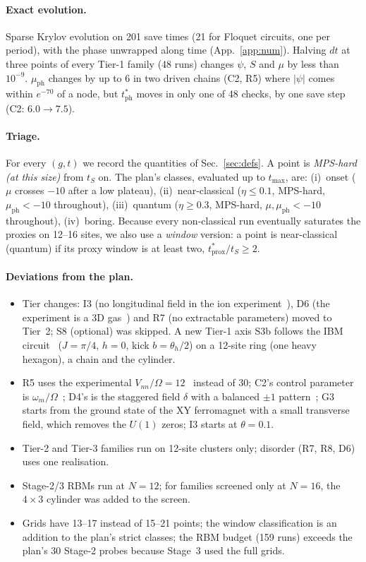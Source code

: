 \documentclass[11pt,a4paper]{article}
\newcommand{\tph}{t^*_{\mathrm{ph}}}
\newcommand{\tprox}{t^*_{\mathrm{prox}}}
\begin{document}
\paragraph{Exact evolution.} Sparse Krylov evolution on 201 save times (21 for Floquet circuits, one per period),
with the phase unwrapped along time (App.~\ref{app:num}). Halving $dt$ at three points of every Tier-1 family (48 runs)
changes $\psi$, $S$ and $\mu$ by less than $10^{-9}$. $\mu_{\mathrm{ph}}$ changes by up to $6$ in two driven chains
(C2, R5) where $|\psi|$ comes within $e^{-70}$ of a node, but $\tph$ moves in only one of 48 checks, by one save step
(C2: $6.0\to7.5$).

\paragraph{Triage.} For every $(g,t)$ we record the quantities of Sec.~\ref{sec:defs}. A point is
\emph{MPS-hard (at this size)} from $t_S$ on. The plan's classes,
evaluated up to $t_{\max}$, are: (i)~onset ($\mu$ crosses $-10$ after a low plateau), (ii)~near-classical
($\eta\le0.1$, MPS-hard, $\mu_{\mathrm{ph}}<-10$ throughout), (iii)~quantum ($\eta\ge0.3$,
MPS-hard, $\mu,\mu_{\mathrm{ph}}<-10$ throughout), (iv)~boring. Because every non-classical run
eventually saturates the proxies on 12--16 sites, we also use a \emph{window} version: a point is near-classical
(quantum) if its proxy window is at least two, $\tprox/t_S\ge2$.

\paragraph{Deviations from the plan.}
\begin{itemize}
  \item Tier changes: I3 (no longitudinal field in the ion experiment~\cite{Tan21}), D6 (the experiment is a 3D
    gas~\cite{Signoles21}) and R7 (no extractable parameters) moved to Tier~2; S8 (optional) was skipped. A new
    Tier-1 axis S3b follows the IBM circuit~\cite{Kim23} ($J=\pi/4$, $h=0$, kick $b=\theta_h/2$) on a 12-site ring
    (one heavy hexagon), a chain and the cylinder.
  \item R5 uses the experimental $V_{nn}/\Omega=12$~\cite{Bernien17} instead of $30$; C2's control parameter is
    $\omega_m/\Omega$~\cite{Bluvstein21}; D4's is the staggered field $\delta$ with a balanced $\pm1$ pattern~\cite{Bintz24};
    G3 starts from the ground state of the XY ferromagnet with a small transverse field, which removes the $U(1)$
    zeros; I3 starts at $\theta=0.1$.
  \item Tier-2 and Tier-3 families run on 12-site clusters only; disorder (R7, R8, D6) uses one realisation.
  \item Stage-2/3 RBMs run at $N=12$; for families screened only at $N=16$, the $4\times3$ cylinder was added to the
    screen.
  \item Grids have 13--17 instead of 15--21 points; the window classification is an addition to the plan's strict
    classes; the RBM budget (159 runs) exceeds the plan's 30 Stage-2 probes because Stage~3 used the full grids.
\end{itemize}
\end{document}
